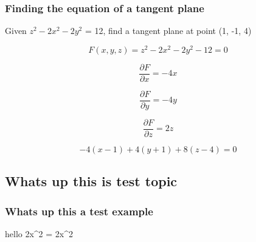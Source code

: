 \documentclass{article}
\begin{document}
\subsubsection{Finding the equation of a tangent plane}
Given $z^2 - 2x^2 - 2y^2$ = 12, find a tangent plane at point (1, -1, 4)

\begin{equation}
F(x, y, z) = z^2 - 2x^2 - 2y^2 - 12 = 0
\end{equation}

\begin{equation}
\frac{\partial F}{\partial x} = -4x
\end{equation}

\begin{equation}
\frac{\partial F}{\partial y} = -4y
\end{equation}

\begin{equation}
\frac{\partial F}{\partial z} = 2z
\end{equation}

\begin{equation}
-4(x-1) + 4(y+1) +8(z-4) = 0
\end{equation}

\subsection{Whats up this is test topic}

\subsubsection{    Whats up this a test example}
hello 2x^2 = 2x^2\\
\end{document}
